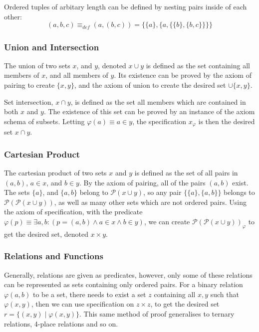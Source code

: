 \documentclass[11pt]{report}
\theoremstyle{definition}
\theoremstyle{theorem}
\theoremstyle{lemma}
\begin{document}
Ordered tuples of arbitary length can be defined by nesting pairs inside of each other:
$$(a,b,c) \equiv_{\mathit{def}} (a,(b,c)) = \{\{a\},\{a, \{\{b\},\{b,c\}\}\}\}$$

\subsubsection*{Union and Intersection}
The union of two sets $x$, and $y$, denoted $x\cup y$ is defined as the set containing all members of $x$, and all members of $y$. Its existence can be proved by the axiom of pairing to create $\{x,y\}$, and the axiom of union to create the desired set $\cup \{x,y\}$.

Set intersection, $x \cap y$, is defined as the set all members which are contained in both $x$ and $y$.
The existence of this set can be proved by an instance of the axiom schema of subsets. Letting $\varphi(a) \equiv a \in y$, the specification $x_\varphi$ is then the desired set $x \cap y$.

\subsubsection*{Cartesian Product}
The cartesian product of two sets $x$ and $y$ is defined as the set of all pairs in $(a,b)$, $a\in x$, and $b\in y$.
By the axiom of pairing, all of the pairs $(a,b)$ exist.
The sets $\{a\}$, and $\{a,b\}$ belong to $\mathcal{P}(x\cup y)$, so any pair $\{\{a\},\{a,b\}\}$ belongs to $\mathcal{P}(\mathcal{P}(x\cup y))$, as well as many other sets which are not ordered pairs.
Using the axiom of specification, with the predicate
$\varphi(p) \equiv \exists a,b: (p = (a,b) \wedge a\in x \wedge b\in y)$, we can create $\mathcal{P}(\mathcal{P}(x\cup y))_{\varphi}$ to get the desired set, denoted $x\times y$.

\subsubsection*{Relations and Functions}
Generally, relations are given as predicates, however, only some of these relations can be represented as sets containing only ordered pairs.
For a binary relation $\varphi(a,b)$ to be a set, there needs to exist a set $z$ containing all $x,y$ such that $\varphi(x,y)$, then we can use specification on $z\times z$, to get the desired set $r = \{(x,y) \mid \varphi(x,y)\}$.
This same method of proof generalises to ternary relations, 4-place relations and so on.
\end{document}
